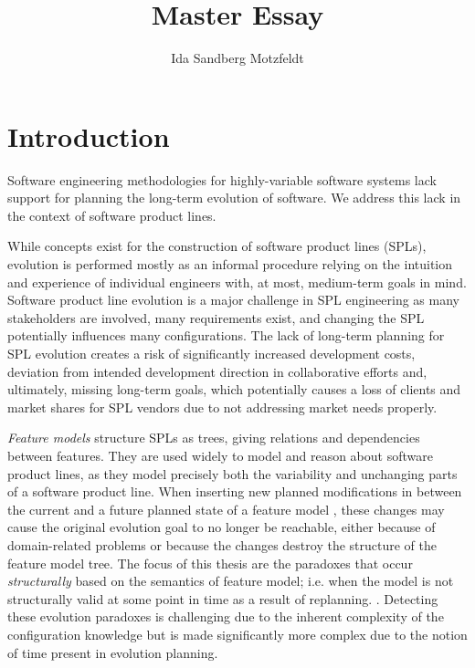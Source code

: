 \documentclass[a4paper,english]{ifimaster}
\title{Master Essay}
\author{Ida Sandberg Motzfeldt}
\begin{document}
\maketitle
\newpage

\frontmatter{}

\tableofcontents

\mainmatter{}

\chapter{Introduction}%
\label{cha:introduction}
Software engineering methodologies for highly-variable software systems lack support for planning the long-term evolution of software. We address this lack in the context of software product lines.

While concepts exist for the construction of software product lines (SPLs), evolution is performed mostly as an informal procedure relying on the intuition and experience of individual engineers with, at most, medium-term goals in mind. Software product line evolution is a major challenge in SPL engineering as many stakeholders are involved, many requirements exist, and changing the SPL potentially influences many configurations.  The lack of long-term planning for SPL evolution creates a risk of significantly increased development costs, deviation from intended development direction in collaborative efforts and, ultimately, missing long-term goals, which potentially causes a loss of clients and market shares for SPL vendors due to not addressing market needs properly.

\emph{Feature models} structure SPLs as trees, giving relations and dependencies between features. They are used widely to model and reason about software product lines, as they model precisely both the variability and unchanging parts of a software product line. 
When inserting new planned modifications in between the current and a future planned state of a feature model 
, these changes may cause the original evolution goal to no longer be reachable, either because of domain-related problems or because the changes destroy the structure of the feature model tree. The focus of this thesis are the paradoxes that occur \emph{structurally} based on the semantics of feature model; i.e. when the model is not structurally valid at some point in time as a result of replanning. 
. Detecting these evolution paradoxes is challenging due to the inherent complexity of the configuration knowledge but is made significantly more complex due to the notion of time present in evolution planning.
\end{document}
